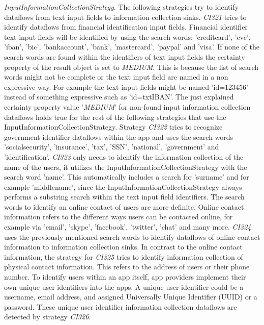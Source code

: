 \textit{InputInformationCollectionStrategy}. The following strategies try to identify dataflows from text input fields to information collection sinks.
\textit{CI321} tries to identify dataflows from financial identification input fields. 
Financial identifier text input fields will be identified by using the search words: 'creditcard', 'cvc', 'iban', 'bic', 'bankaccount', 'bank', 'mastercard', 'paypal' and 'visa'.
If none of the search words are found within the identifiers of text input fields the certainty property of the result object is set to \textit{MEDIUM}.
This is because the list of search words might not be complete or the text input field are named in a non expressive way.
For example the text input fields might be named 'id=123456' instead of something expressive such as 'id=txtIBAN'.
The just explained certainty property value '\textit{MEDIUM}' for non-found input information collection dataflows holds true for the rest of the following strategies that use the InputInformationCollectionStrategy.
Strategy \textit{CI322} tries to recognize government identifier dataflows within the app and uses the search words 'socialsecurity', 'insurance', 'tax', 'SSN', 'national', 'government' and 'identification'.
\textit{CI323} only needs to identify the information collection of the name of the users, it utilizes the InputInformationCollectionStrategy with the search word 'name'. 
This automatically includes a search for 'surname' and for example 'middlename', since the InputInformationCollectionStrategy always performs a substring search within the text input field identifiers.
The search words to identify an online contact of users are more definite.
Online contact information refers to the different ways users can be contacted online, for example via 'email', 'skype', 'facebook', 'twitter', 'chat' and many more.
\textit{CI324} uses the previously mentioned search words to identify dataflows of online contact information to information collection sinks.
In contrast to the online contact information, the strategy for \textit{CI325} tries to identify information collection of physical contact information.
This refers to the address of users or their phone number.
To identify users within an app itself, app providers implement their own unique user identifiers into the apps.
A unique user identifier could be a username, email address, and assigned Universally Unique Identifier (\acs{UUID}) or a password.
These unique user identifier information collection dataflows are detected by strategy \textit{CI326}.
